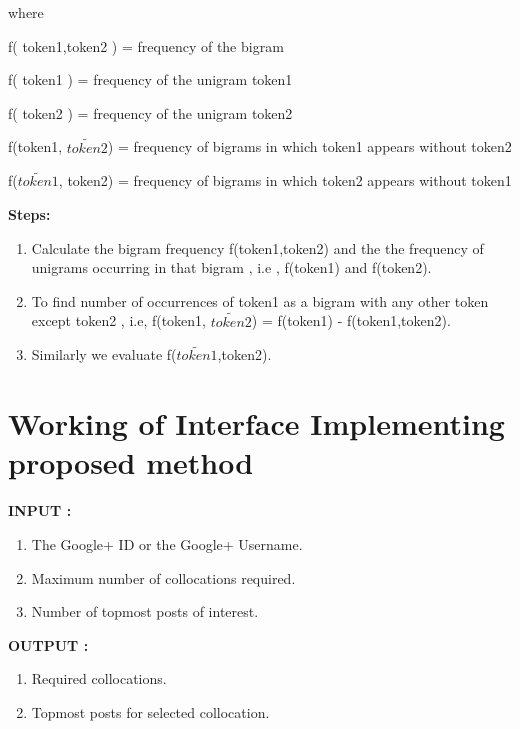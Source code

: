 \documentclass{mnnit}
\begin{document}
               

\noindent where 


\noindent f( token1,token2 ) 	         =  frequency of the bigram


\noindent f( token1 )	     	         =  frequency of the unigram token1


\noindent f( token2 )	     	         =  frequency of the unigram token2


\noindent f(token1, $\widetilde{token2}$)	     =  frequency of  bigrams in which  token1  appears  without  token2


\noindent f($\widetilde{token1}$, token2)	     =  frequency  of   bigrams in  which  token2  appears  without  token1



\noindent \textbf{Steps:}
\begin{enumerate}
\item Calculate the bigram frequency f(token1,token2)  and the the frequency of unigrams occurring in that bigram , i.e , f(token1)  and f(token2).
\item To find number of occurrences of token1 as a bigram with any other token except token2 , i.e, f(token1, $\widetilde{token2}$) = f(token1) - f(token1,token2).

\item Similarly we evaluate f($\widetilde{token1}$,token2).
\end{enumerate}



\section{Working of Interface Implementing proposed method }

\noindent \textbf{INPUT :}

\begin{enumerate}
\item The Google+ ID or the Google+ Username.
\item Maximum number of collocations required.
\item Number of topmost posts of interest.
\end{enumerate}
 

\noindent \textbf{OUTPUT :}
\begin{enumerate}
\item Required collocations.
\item Topmost posts for selected collocation.
\end{enumerate}
\end{document}
